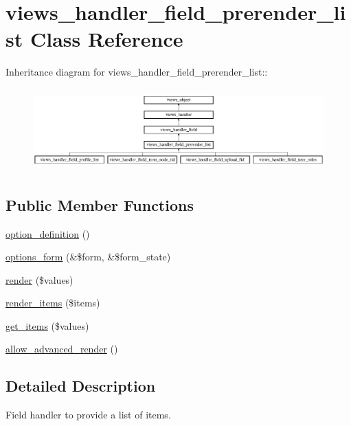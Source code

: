 \hypertarget{classviews__handler__field__prerender__list}{
\section{views\_\-handler\_\-field\_\-prerender\_\-list Class Reference}
\label{classviews__handler__field__prerender__list}
}
Inheritance diagram for views\_\-handler\_\-field\_\-prerender\_\-list::\begin{figure}[H]
\begin{center}
\leavevmode
\includegraphics[height=3.19635cm]{classviews__handler__field__prerender__list}
\end{center}
\end{figure}
\subsection*{Public Member Functions}
\begin{CompactItemize}
\item 
\hyperlink{classviews__handler__field__prerender__list_3787d1e3974a37c72f71c062eee52b3d}{option\_\-definition} ()
\item 
\hyperlink{classviews__handler__field__prerender__list_6a88df29dbdd11aefc5d108dca6530e0}{options\_\-form} (\&\$form, \&\$form\_\-state)
\item 
\hyperlink{classviews__handler__field__prerender__list_e29a9fc47e5a83e9a8eb314dc46e68cf}{render} (\$values)
\item 
\hyperlink{classviews__handler__field__prerender__list_7034bf6badaa12c750ac451f4435ce0a}{render\_\-items} (\$items)
\item 
\hyperlink{classviews__handler__field__prerender__list_69ff2ab99e152c72dc16bdcb4610c2f0}{get\_\-items} (\$values)
\item 
\hyperlink{classviews__handler__field__prerender__list_341b000d2b0e13c3819e47165ca33ec9}{allow\_\-advanced\_\-render} ()
\end{CompactItemize}


\subsection{Detailed Description}
Field handler to provide a list of items.

